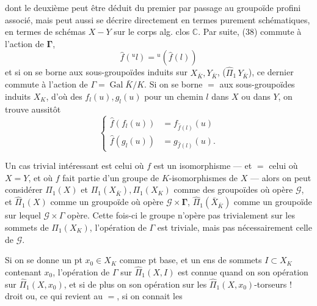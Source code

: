 dont le deuxième peut être déduit du premier par passage au groupoïde profini associé, mais peut aussi se décrire directement en termes purement schématiques, en termes  de schémas  $X\mathbin{-}Y$ sur le corps alg. clos $\mathbb C$. Par suite, (38) commute à l'action de $\mathbf{\Gamma}$,
\[
\tag{39}\widehat f({}^ul)={}^u(\widehat f(l))
\]
et si on se borne aux sous-groupoïdes induits sur $X_{\bar K},Y_{\bar K}$,  ($\widehat\Pi_1\,Y_{\bar K}$), ce dernier commute à l'action de $\Gamma=\operatorname{Gal}\bar K/K$. Si on se borne $=$ aux sous-groupoïdes induits $X_K$, d'où des $f_l(u),g_l(u)$ pour un chemin $l$ dans $X$ ou dans $Y$, on trouve aussitôt
\[
\tag{40}\left\{\begin{aligned}
\widehat f(f_l(u))&=f_{\widehat f(l)}(u)\\
\widehat f(g_l(u))&=g_{\widehat f(l)}(u).
\end{aligned}\right.
\]

Un cas trivial intéressant est celui où $f$ est un isomorphisme --- et $=$ celui où $X=Y$, et où $f$ fait partie d'un groupe  de $K$-isomorphismes de $X$ --- alors on peut considérer $\Pi_1(X)$ et $\Pi_1(X_{\bar K}),\Pi_1(X_K)$ comme des groupoïdes où opère $\mathcal G$, et $\widehat\Pi_1(X)$ comme un groupoïde où opère $\mathcal G\times\mathbf{\Gamma}$, $\widehat\Pi_1(\bar X_{\bar K})$ comme un groupoïde sur lequel $\mathcal G\times\Gamma$ opère. Cette fois-ci le groupe n'opère pas trivialement sur les sommets de $\Pi_1(X_K)$, l'opération de $\Gamma$ est triviale, mais pas nécessairement celle de $\mathcal G$.

Si on se donne un pt $x_0\in X_K$ comme pt base, et un ens de sommets $I\subset X_K$ contenant $x_0$, l'opération de $\Gamma$ sur $\widehat\Pi_1(X,I)$ est connue quand on  son opération sur $\widehat\Pi_1(X,x_0)$, et si de plus on  son opération sur les $\widehat\Pi_1(X,x_0)$-torseurs ! droit
ou, ce qui revient au $=$, si on connait les

